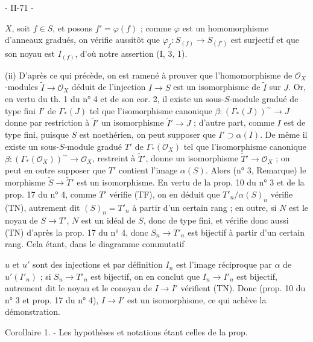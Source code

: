 
- II-71 -

$X$, soit $f \in S$, et posons $f' = \varphi(f)$ ; comme $\varphi$ est un homomorphisme d'anneaux gradués, on vérifie aussitôt que $\varphi_f : S_{(f)} \to S_{(f')}$ est surjectif et que son noyau est $I_{(f)}$, d'où notre assertion (I, 3, 1).

(ii) D'après ce qui précède, on est ramené à prouver que l'homomorphisme de $\mathcal{O}_X$-modules $\tilde{I} \to \mathcal{O}_X$ déduit de l'injection $I \to S$ est un isomorphisme de $\tilde{I}$ sur $J$. Or, en vertu du th. 1 du n° 4 et de son cor. 2, il existe un sous-$S$-module gradué de type fini $I'$ de $\Gamma_*(J)$ tel que l'isomorphisme canonique $\beta : (\Gamma_*(J))^\sim \to J$ donne par restriction à $\tilde{I}'$ un isomorphisme $\tilde{I}' \to J$ ; d'autre part, comme $I$ est de type fini, puisque $S$ est noethérien, on peut supposer que $I' \supset \alpha(I)$. De même il existe un sous-$S$-module gradué $T'$ de $\Gamma_*(\mathcal{O}_X)$ tel que l'isomorphisme canonique $\beta : (\Gamma_*(\mathcal{O}_X))^\sim \to \mathcal{O}_X$, restreint à $\tilde{T}'$, donne un isomorphisme $\tilde{T}' \to \mathcal{O}_X$ ; on peut en outre supposer que $T'$ contient l'image $\alpha(S)$. Alors (n° 3, Remarque) le morphisme $\tilde{S} \to \tilde{T}'$ est un isomorphisme. En vertu de la prop. 10 du n° 3 et de la prop. 17 du n° 4, comme $T'$ vérifie (TF), on en déduit que $T'_n / \alpha(S)_n$ vérifie (TN), autrement dit $(S)_n = T'_n$ à partir d'un certain rang ; en outre, si $N$ est le noyau de $S \to T'$, $N$ est un idéal de $S$, donc de type fini, et vérifie donc aussi (TN) d'après la prop. 17 du n° 4, donc $S_n \to T'_n$ est bijectif à partir d'un certain rang. Cela étant, dans le diagramme commutatif


$u$ et $u'$ sont des injections et par définition $I_n$ est l'image réciproque par $\alpha$ de $u'(I'_n)$ ; si $S_n \to T'_n$ est bijectif, on en conclut que $I_n \to I'_n$ est bijectif, autrement dit le noyau et le conoyau de $I \to I'$ vérifient (TN). Donc (prop. 10 du n° 3 et prop. 17 du n° 4), $I \to I'$ est un isomorphisme, ce qui achève la démonstration.

Corollaire 1. - Les hypothèses et notations étant celles de la prop.

